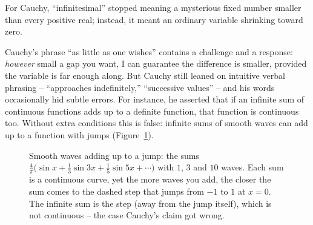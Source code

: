 For Cauchy, ``infinitesimal'' stopped meaning a mysterious fixed number smaller than every positive real; instead, it meant an ordinary variable shrinking toward zero.

Cauchy's phrase ``as little as one wishes'' contains a
challenge and a response: \emph{however} small a gap you want, I can guarantee the difference is
smaller, provided the variable is far enough along. But Cauchy still leaned on intuitive verbal
phrasing -- ``approaches indefinitely,'' ``successive values'' -- and his words occasionally hid
subtle errors. For instance, he asserted that if an infinite sum of continuous functions adds up
to a definite function, that function is continuous too. Without extra conditions this is
false: infinite sums of smooth waves can add up to a function with jumps
(Figure~\ref{ch05:waves}).

\begin{figure}[htbp]
\centering
{}
\caption{Smooth waves adding up to a jump: the sums
$\frac{4}{\pi}\bigl(\sin x + \frac{1}{3}\sin 3x + \frac{1}{5}\sin 5x + \cdots\bigr)$ with $1$, $3$
and $10$ waves. Each sum is a continuous curve, yet the more waves you add, the closer the sum
comes to the dashed step that jumps from $-1$ to $1$ at $x=0$. The infinite sum is the step
(away from the jump itself), which is not continuous -- the case Cauchy's claim got wrong.}
\label{ch05:waves}
\end{figure}

